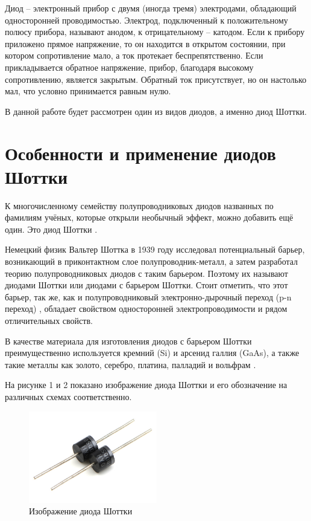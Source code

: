 \documentclass[spec, och, referat]{shiza}
\begin{document}
\tableofcontents

\intro

Диод -- электронный прибор с двумя (иногда тремя) электродами, обладающий односторонней проводимостью. Электрод, подключенный к положительному 
полюсу прибора, называют анодом, к отрицательному – катодом. Если к прибору приложено прямое напряжение, то он находится в открытом состоянии, 
при котором сопротивление мало, а ток протекает беспрепятственно. Если прикладывается обратное напряжение, прибор, благодаря высокому 
сопротивлению, является закрытым. Обратный ток присутствует, но он настолько мал, что условно принимается равным нулю.

В данной работе будет рассмотрен один из видов диодов, а именно диод Шоттки.

\section{Особенности и применение диодов Шоттки}

К многочисленному семейству полупроводниковых диодов названных по фамилиям учёных, которые открыли необычный эффект, можно добавить ещё один. Это диод Шоттки \cite{1}.

Немецкий физик Вальтер Шоттка в 1939 году исследовал потенциальный барьер, возникающий в приконтактном слое полупроводник-металл, а затем разработал теорию 
полупроводниковых диодов с таким барьером. Поэтому их называют диодами Шоттки или диодами с барьером Шоттки. Стоит отметить, что этот барьер, так же, 
как и полупроводниковый электронно-дырочный переход (p-n переход) , обладает свойством односторонней электропроводимости и рядом отличительных свойств.

В качестве материала для изготовления диодов с барьером Шоттки преимущественно используется кремний (Si) и арсенид галлия (GaAs), а также такие 
металлы как золото, серебро, платина, палладий и вольфрам \cite{1}.

На рисунке 1 и 2 показано изображение диода Шоттки и его обозначение на различных схемах соответственно.

\begin{figure}[H]
  \centering
  \includegraphics[width=0.5\textwidth]{photo/7.png}
  \caption{Изображение диода Шоттки}
\end{figure}
\end{document}
